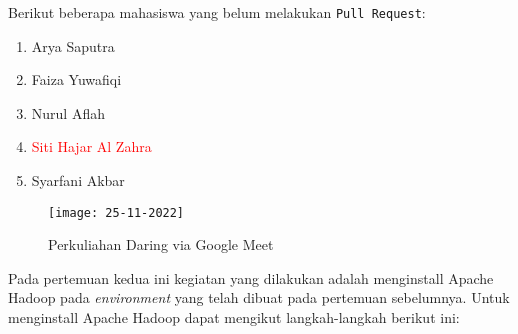 \documentclass[a4paper]{tufte-handout}
\begin{document}
\noindent
Berikut beberapa mahasiswa yang belum melakukan {\tt Pull Request}:
\begin{multicols}{2}
\begin{enumerate}
\item Arya Saputra
\item Faiza Yuwafiqi
\item Nurul Aflah
\item \textcolor{red}{Siti Hajar Al Zahra}
\item Syarfani Akbar
\end{enumerate}
\end{multicols}

\begin{figure}[!ht]
\texttt{[image: 25-11-2022]}
\caption{Perkuliahan Daring via Google Meet}
\label{gam:perkuliahan-25-11}
\end{figure}

\vspace*{-.5cm}
\hrulefill

\clearpage
{}


Pada pertemuan kedua ini kegiatan yang dilakukan adalah menginstall Apache Hadoop pada \textit{environment} yang telah dibuat pada pertemuan sebelumnya. Untuk menginstall Apache Hadoop dapat mengikut langkah-langkah berikut ini:
\end{document}
